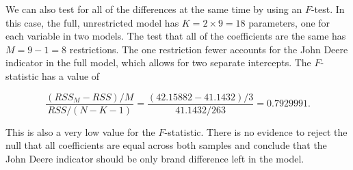 \documentclass[11pt]{paper}
\begin{document}


We can also test for all of the differences at the same time
by using an $F$-test. 
In this case, the full, unrestricted model has $K = 2\times9 = 18$ parameters, one for each variable in two models. 
The test that all of the coefficients are the same has $M = 9 - 1 = 8$
restrictions. 
The one restriction fewer accounts for the John Deere indicator
in the full model, 
which allows for two separate intercepts. 
% 
The $F$-statistic has a value of 

$$ 
\frac{(RSS_M - RSS)/M}{RSS/(N - K - 1)} = \frac{(42.15882 - 41.1432)/3}{41.1432/263} = 0.7929991. 
$$

This is also a very low value for the $F$-statistic. 
There is no evidence to reject the null that all 
coefficients are equal across both samples 
and conclude that the John Deere indicator
should be only brand difference left in the model. 

\end{document}

